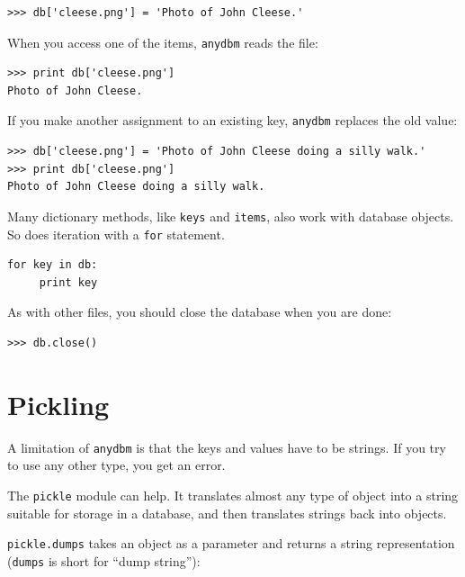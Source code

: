 \documentclass[10pt]{book}
\begin{document}


\beforeverb
\begin{verbatim}
>>> db['cleese.png'] = 'Photo of John Cleese.'
\end{verbatim}
\afterverb
%
When you access one of the items, {\tt anydbm} reads the file:

\beforeverb
\begin{verbatim}
>>> print db['cleese.png']
Photo of John Cleese.
\end{verbatim}
\afterverb
%
If you make another assignment to an existing key, {\tt anydbm} replaces
the old value:

\beforeverb
\begin{verbatim}
>>> db['cleese.png'] = 'Photo of John Cleese doing a silly walk.'
>>> print db['cleese.png']
Photo of John Cleese doing a silly walk.
\end{verbatim}
\afterverb
%
Many dictionary methods, like {\tt keys} and {\tt items}, also
work with database objects.  So does iteration with a {\tt for}
statement.


\beforeverb
\begin{verbatim}
for key in db:
     print key
\end{verbatim}
\afterverb
%
As with other files, you should close the database when you are
done:

\beforeverb
\begin{verbatim}
>>> db.close()
\end{verbatim}
\afterverb
%



\section{Pickling}


A limitation of {\tt anydbm} is that the keys and values have
to be strings.  If you try to use any other type, you get an
error.


The {\tt pickle} module can help.  It translates
almost any type of object into a string suitable for storage in a
database, and then translates strings back into objects.

{\tt pickle.dumps} takes an object as a parameter and returns
a string representation ({\tt dumps} is short for ``dump string''):
\end{document}
